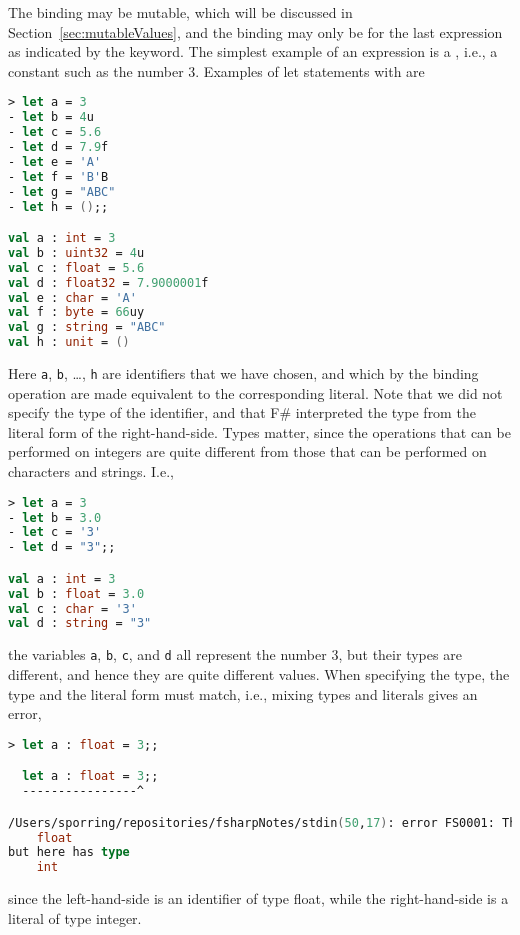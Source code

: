 The binding may be mutable, which will be discussed in Section~\ref{sec:mutableValues}, and the binding may only be for the last expression as indicated by the  keyword. The simplest example of an expression is a , i.e., a constant such as the number 3. Examples of let statements with  are
%
\begin{lstlisting}[language=fsharp,caption={fsharpi, binding identifiers and literals.}]
> let a = 3 
- let b = 4u 
- let c = 5.6 
- let d = 7.9f 
- let e = 'A'
- let f = 'B'B 
- let g = "ABC" 
- let h = ();;

val a : int = 3
val b : uint32 = 4u
val c : float = 5.6
val d : float32 = 7.9000001f
val e : char = 'A'
val f : byte = 66uy
val g : string = "ABC"
val h : unit = ()
\end{lstlisting}
%
Here \lstinline|a|, \lstinline|b|, \dots, \lstinline|h| are identifiers that we have chosen, and which by the binding operation are made equivalent to the corresponding literal. Note that we did not specify the type of the identifier, and that F\# interpreted the type from the literal form of the right-hand-side. Types matter, since the operations that can be performed on integers are quite different from those that can be performed on characters and strings. I.e.,
%
\begin{lstlisting}[language=fsharp,caption={fsharpi, many representations of the number 3 but using different types.}]
> let a = 3
- let b = 3.0 
- let c = '3' 
- let d = "3";;

val a : int = 3
val b : float = 3.0
val c : char = '3'
val d : string = "3"
\end{lstlisting}
the variables \lstinline|a|, \lstinline|b|, \lstinline|c|, and \lstinline|d| all represent the number 3, but their types are different, and hence they are quite different values. When specifying the type, the type and the literal form must match, i.e., mixing types and literals gives an error,
%
\begin{lstlisting}[language=fsharp,caption={fsharpi, binding error due to type mismatch.}]
  > let a : float = 3;;

  let a : float = 3;;
  ----------------^

/Users/sporring/repositories/fsharpNotes/stdin(50,17): error FS0001: This expression was expected to have type
    float    
but here has type
    int    
\end{lstlisting}
since the left-hand-side is an identifier of type float, while the right-hand-side is a literal of type integer.


